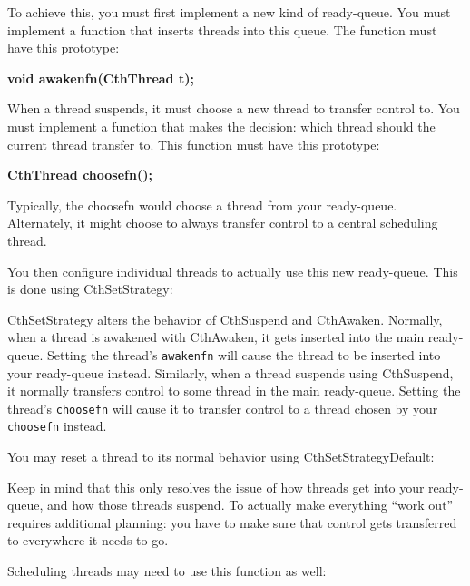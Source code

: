 To achieve this, you must first implement a new kind of ready-queue.
You must implement a function that inserts threads into this queue.
The function must have this prototype:

{\bf void awakenfn(CthThread t);}

When a thread suspends, it must choose a new thread to transfer control
to.  You must implement a function that makes the decision: which thread
should the current thread transfer to.  This function must have this
prototype:

{\bf CthThread choosefn();}

Typically, the choosefn would choose a thread from your ready-queue.
Alternately, it might choose to always transfer control to a central
scheduling thread.

You then configure individual threads to actually use this new
ready-queue.  This is done using CthSetStrategy:


CthSetStrategy alters the behavior of CthSuspend and CthAwaken.
Normally, when a thread is awakened with CthAwaken, it gets inserted
into the main ready-queue.  Setting the thread's {\tt awakenfn} will
cause the thread to be inserted into your ready-queue instead.
Similarly, when a thread suspends using CthSuspend, it normally
transfers control to some thread in the main ready-queue.  Setting the
thread's {\tt choosefn} will cause it to transfer control to a thread
chosen by your {\tt choosefn} instead.

You may reset a thread to its normal behavior using CthSetStrategyDefault:


Keep in mind that this only resolves the issue of how threads get into
your ready-queue, and how those threads suspend.  To actually make
everything ``work out'' requires additional planning: you have to make
sure that control gets transferred to everywhere it needs to go.

Scheduling threads may need to use this function as well:


